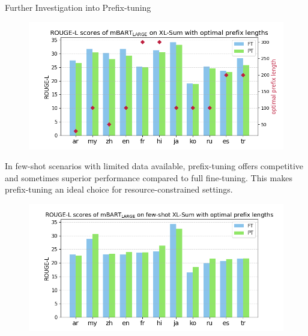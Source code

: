\documentclass[final]{beamer}
\newlength{\colwidth}
\begin{document}
\begin{frame}[t]
\begin{columns}[t]
\begin{column}{\colwidth}
\begin{block}{Further Investigation into Prefix-tuning}
    \begin{figure}
    \centering
    \includegraphics[width=\textwidth]{fig/mbart-opt-len.png}
    \end{figure}



    In few-shot scenarios with limited data available, prefix-tuning offers competitive and sometimes superior performance compared to full fine-tuning.
    This makes prefix-tuning an ideal choice for resource-constrained settings.

    \begin{figure}
    \centering
    \includegraphics[width=\textwidth]{fig/mbart-few-shot.png}
    \end{figure}
  \end{block}


\end{column}
\end{columns}
\end{frame}
\end{document}

